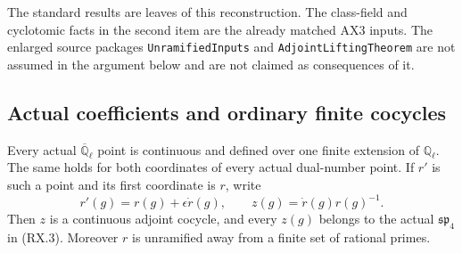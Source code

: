 The standard results are leaves of this reconstruction.  The class-field
and cyclotomic facts in the second item are the already matched AX3
inputs.  The enlarged
source packages \texttt{UnramifiedInputs} and
\texttt{AdjointLiftingTheorem} are not assumed in the argument below and
are not claimed as consequences of it.

\subsection{Actual coefficients and ordinary finite cocycles}

\begin{proposition}
\label{prop:rx-coefficients}
Every actual $\overline{\mathbb Q}_\ell$ point is continuous and defined
over one finite extension of $\mathbb Q_\ell$.  The same holds for both
coordinates of every actual dual-number point.  If $r'$ is such a point
and its first coordinate is $r$, write
\[
 r'(g)=r(g)+\epsilon\dot r(g),\qquad
 z(g)=\dot r(g)r(g)^{-1}.
 \tag{RX.4}
\]
Then $z$ is a continuous adjoint cocycle, and every $z(g)$ belongs to the
actual $\mathfrak{sp}_4$ in (RX.3).  Moreover $r$ is unramified away from
a finite set of rational primes.
\end{proposition}

